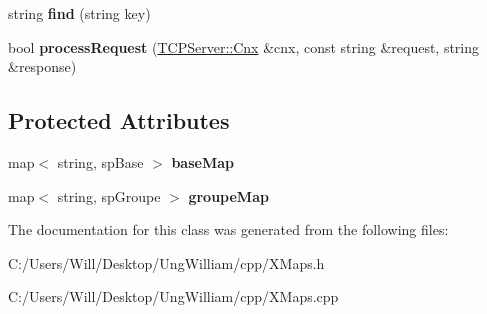 \begin{DoxyCompactItemize}
\item 
string {\bfseries find} (string key)\hypertarget{class_x_maps_af9e00ed252d47df69f70c6d99a964195}{}\label{class_x_maps_af9e00ed252d47df69f70c6d99a964195}

\item 
bool {\bfseries process\+Request} (\hyperlink{class_t_c_p_server_1_1_cnx}{T\+C\+P\+Server\+::\+Cnx} \&cnx, const string \&request, string \&response)\hypertarget{class_x_maps_a95715b70da3dcef748fa46ead88613ca}{}\label{class_x_maps_a95715b70da3dcef748fa46ead88613ca}

\end{DoxyCompactItemize}
\subsection*{Protected Attributes}
\begin{DoxyCompactItemize}
\item 
map$<$ string, sp\+Base $>$ {\bfseries base\+Map}\hypertarget{class_x_maps_a294c98cacd43c3015de8fc51de4e493f}{}\label{class_x_maps_a294c98cacd43c3015de8fc51de4e493f}

\item 
map$<$ string, sp\+Groupe $>$ {\bfseries groupe\+Map}\hypertarget{class_x_maps_a341528368e04f64f7cb62eb21a120f3a}{}\label{class_x_maps_a341528368e04f64f7cb62eb21a120f3a}

\end{DoxyCompactItemize}


The documentation for this class was generated from the following files\+:\begin{DoxyCompactItemize}
\item 
C\+:/\+Users/\+Will/\+Desktop/\+Ung\+William/cpp/X\+Maps.\+h\item 
C\+:/\+Users/\+Will/\+Desktop/\+Ung\+William/cpp/X\+Maps.\+cpp\end{DoxyCompactItemize}
